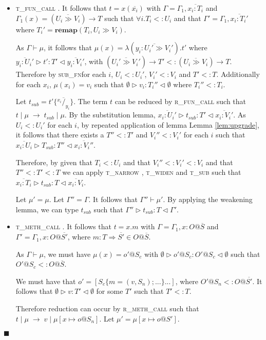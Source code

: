\documentclass[preprint]{sigplanconf}
\newcommand{\lemref}[1]{Lemma \ref{#1}}
\newcommand{\rfunc}{\textsc{r\_fun\_call} }
\newcommand{\rmethc}{\textsc{r\_meth\_call} }
\newcommand{\tfunc}{\textsc{t\_fun\_call} }
\newcommand{\tmethc}{\textsc{t\_meth\_call} }
\newcommand{\tsub}{\textsc{t\_sub} }
\newcommand{\tnarrow}{\textsc{t\_narrow} }
\newcommand{\twiden}{\textsc{t\_widen} }
\newcommand{\subfn}{\textsc{sub\_fn}}
\newcommand{\remapapp}[3]{\ensuremath{\mathbf{remap}(#1, #2 \gg #3)}}
\newcommand{\typerule}[4]{#1 \triangleright #2 : #3 \triangleleft #4}
\newcommand{\oprule}[4]{#1 \mid #2\;\longrightarrow\;#3 \mid #4}
\newcommand{\subst}[3]{#3 \{\overline{^{#1}/_{#2}}\}}
\newcommand{\funv}[4]{\lambda(\overline{#1 : #2 \gg #3}).#4}
\newcommand{\funt}[3]{(\overline{#1 \gg #2}) \rightarrow #3}
\newcommand{\qed}{$\blacksquare$}
\newenvironment{proof}{\vspace{1ex}\noindent{\bf Proof}\hspace{0.5em}}
  {\hfill\qed\vspace{1ex}}
\begin{document}
\begin{proof}
\begin{itemize}
\begin{itemize}
  \end{itemize}

\item \tfunc. It follows that $t = x ( \overline{x_i} )$ with
$\Gamma = \Gamma_1, \overline{x_i : T_i}$ 
and $\Gamma_1(x) = \funt{U_i}{V_i}{T}$
such that $\forall i . T_i <: U_i$ 
and that $\Gamma' = \Gamma_1, \overline{x_i : T_i'}$
where $T_i' = \remapapp{T_i}{U_i}{V_i}$.

As $\Gamma \vdash \mu$, 
it follows that $\mu(x) = \funv{y_i}{U_i'}{V_i'}{t'}$
where $\typerule{\overline{y_i : U_i'}}{t'}{T'}{\overline{y_i : V_i'}}$,
with $\funt{U_i'}{V_i'}{T'} <: \funt{U_i}{V_i}{T}$. 
Therefore by \subfn for each $i$, $U_i <: U_i'$, $V_i' <: V_i$
and $T' <: T$.
Additionally for each $x_i$, $\mu(x_i) = v_i$ such that 
$\typerule{\emptyset}{v_i}{T_i''}{\emptyset}$ 
where $T_i'' <: T_i$.

Let $t_{sub} = \subst{x_i}{y_i}{t'}$.
The term $t$ can be reduced by \rfunc such that
$\oprule{t}{\mu}{t_{sub}}{\mu}$.
By the substitution lemma, 
$\typerule{\overline{x_i : U_i'}}{t_{sub}}{T'}{\overline{x_i : V_i'}}$.
As $U_i <: U_i'$ for each $i$, by repeated application of lemma 
\lemref{lem:upgrade}, it follows that
there exists a $T'' <: T'$ and $V_i'' <: V_i'$ for each $i$
such that 
$\typerule{\overline{x_i : U_i}}{T_{sub}}{T''}{\overline{x_i : V_i''}}$.

Therefore, by given that $T_i <: U_i$ and that $V_i'' <: V_i' <: V_i$
and that $T'' <: T' <: T$ we can apply \tnarrow, \twiden and \tsub
such that $\typerule{\overline{x_i : T_i}}{t_{sub}}{T}{\overline{x_i : V_i}}$.

Let $\mu' = \mu$. Let $\Gamma'' = \Gamma$. It follows that 
$\Gamma'' \vdash \mu'$. By applying the weakening lemma, we can type 
$t_{sub}$ such that $\typerule{\Gamma''}{t_{sub}}{T}{\Gamma'}$.

\item \tmethc. It follows that $t = x.m$ with
$\Gamma = \Gamma_1, x : O@\overline{S}$ and
$\Gamma' = \Gamma_1, x : O@\overline{S'}$, where
$m : T \Rightarrow \overline{S'} \in O@\overline{S}$.

As
$\Gamma \vdash \mu$, we must have $\mu(x) = o'@S_c$ with
$\typerule{\emptyset}{o'@S_c}{O'@S_c}{\emptyset}$ such that
$O'@S_c <: O@\overline{S}$. 

We must have that
$o' = [ S_c \{ m = (v,S_n) ; ... \} ... ]$, where $O'@S_n <: O@\overline{S'}$. 
It follows that $\typerule{\emptyset}{v}{T'}{\emptyset}$
for some $T'$ such that $T' <: T$.

Therefore reduction can occur by \rmethc such that
$\oprule{t}{\mu}{v}{\mu [x \mapsto o@S_n]}$.
Let $\mu' = \mu [ x \mapsto o@S']$.


\end{itemize}
\end{proof}
\end{document}
